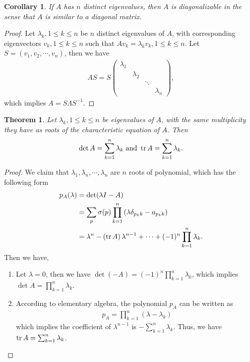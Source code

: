 \documentclass[10pt]{book}
\newtheorem{theorem}{Theorem}[chapter]
\newtheorem{corollary}{Corollary}[theorem]
\theoremstyle{definition}
\numberwithin{equation}{chapter}
\begin{document}
\medskip

\begin{corollary}
If $A$ has $n$ distinct eigenvalues, then $A$ is diagonalizable in the sense that $A$ is similar to a diagonal matrix.
\end{corollary}
\begin{proof}
Let $\lambda_k,1\leq k\leq n$ be $n$ distinct eigenvalues of $A$, with corresponding eigenvectors $v_k,1\leq k\leq n$ such that $Av_k = \lambda_k v_k,1\leq k\leq n$. Let $S = (v_1, v_2,\cdots, v_n)$, then we have
\begin{align*}
    AS = S \begin{pmatrix}
    \lambda_1 &  &  &  \\
     & \lambda_2 &  & \\
     &   & \ddots &  \\
     &  &  & \lambda_n
    \end{pmatrix},
\end{align*}
which implies $A = S\Lambda S^{-1}$.
\end{proof}

\medskip

\begin{theorem}
Let $\lambda_k,1\leq k\leq n$ be eigenvalues of $A$, with the same multiplicity they have as roots of the characteristic equation of $A$. Then 
\begin{align*}
    \det A = \sum^n_{k=1}\lambda_k \,\,\text{and}\,\, \tr A = \sum^n_{k=1}\lambda_k.
\end{align*}
\end{theorem}
\begin{proof}
We claim that $\lambda_1,\lambda_n,\cdots,\lambda_n$ are $n$ roots of polynomial, which has the following form
\begin{align*}
    p_A(\lambda) & = \det (\lambda I - A) \\
    & = \sum_p \sigma(p) \prod^n_{k=1} \left(\lambda \delta_{p_k k} - a_{p_k k}\right) \\
    & = \lambda^n - \left(\tr A \right)\lambda^{n-1} +\cdots + (-1)^n \prod^n_{k=1}\lambda_k.
\end{align*}
Then we have,
\begin{enumerate}[label=(\alph*)]
    \item Let $\lambda = 0$, then we have $\det (-A) = (-1)^n \prod^n_{k=1}\lambda_k$, which implies $\det A = \prod^n_{k=1}\lambda_k$.
    \item According to elementary algebra, the polynomial $p_A$ can be written as 
    \begin{align*}
        p_A = \prod^n_{k=1} (\lambda - \lambda_k)
    \end{align*}
    which implies the coefficient of $\lambda^{n-1}$ is $ - \sum^n_{k=1}\lambda_k$. Thus, we have $\tr A = \sum^n_{k=1}\lambda_k$.
\end{enumerate}
\end{proof}
\end{document}
